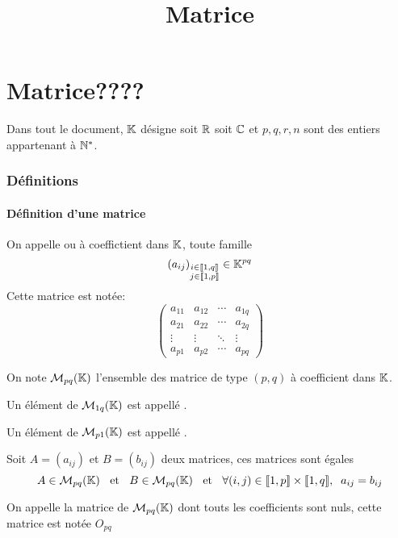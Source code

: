 

\title{Matrice}



\maketitle
\pagebreak
\tableofcontents

\part{Matrice????}

Dans tout le document, $\mathbb{K}$ désigne soit $\mathbb{R}$ soit $\mathbb{C}$ et $p, q, r, n$
sont des entiers appartenant à $\mathbb{N}^*$.

\section{Définitions}


\subsection{Définition d'une matrice}

\begin{dfn}
On appelle  ou  à coeffictient dans $\mathbb{K}$, toute famille
\[
    (a_{ij})_{\substack{i \in \llbracket 1, q \rrbracket \\ j \in \llbracket 1, p \rrbracket}}
    \in \mathbb{K}^{pq}
\]
Cette matrice est notée: 
\[
    \begin{pmatrix}
        a_{11} & a_{12} & \cdots & a_{1q} \\
        a_{21} & a_{22} & \cdots & a_{2q} \\
        \vdots & \vdots & \ddots & \vdots \\
        a_{p1} & a_{p2} & \cdots & a_{pq}
    \end{pmatrix}
\]
\end{dfn}

\begin{dfn}[Notation]
On note $\operatorname{\mathcal{M}}_{pq}(\mathbb{K})$ l'ensemble des matrice de type $(p, q)$ à
coefficient dans $\mathbb{K}$.

Un élément de $\operatorname{\mathcal{M}}_{1q}(\mathbb{K})$ est appellé .

Un élément de $\operatorname{\mathcal{M}}_{p1}(\mathbb{K})$ est appellé .

Soit $A = (a_{ij})$ et $B = (b_{ij})$ deux matrices, ces matrices sont égales \ssi
\[
    A \in \operatorname{\mathcal{M}}_{pq}(\mathbb{K}) \;\;\text{ et }\;\; B \in \operatorname{\mathcal{M}}_{pq}(\mathbb{K}) \;\;\text{ et }\;\;
    \forall (i, j) \in \llbracket 1, p \rrbracket \times \llbracket 1, q \rrbracket, \;\;
    a_{ij} = b_{ij}
\]

On appelle  la matrice de $\operatorname{\mathcal{M}}_{pq}(\mathbb{K})$ dont touts les
coefficients sont nuls, cette matrice est notée $O_{pq}$
\end{dfn}

